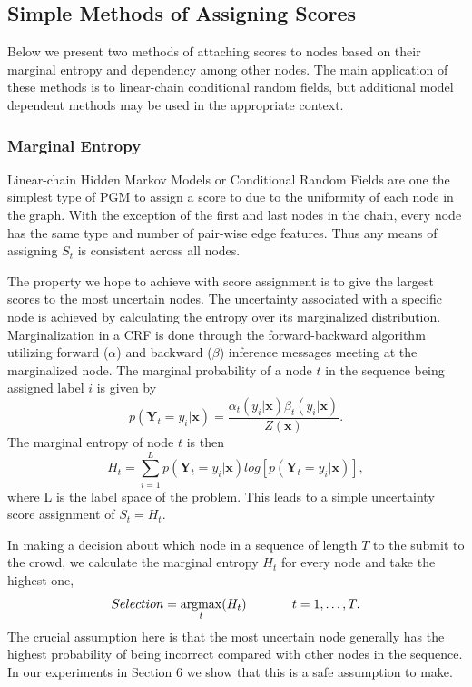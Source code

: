 \subsection{Simple Methods of Assigning Scores}
Below we present two methods of attaching scores to nodes based on their marginal entropy and dependency among other nodes.  The main application of these methods is to linear-chain conditional random fields, but additional model dependent methods may be used in the appropriate context.  

\subsubsection{Marginal Entropy}
Linear-chain Hidden Markov Models or Conditional Random Fields are one the simplest type of PGM to assign a score to due to the uniformity of each node in the graph.  With the exception of the first and last nodes in the chain, every node has the same type and number of pair-wise edge features.  Thus any means of assigning $S_{t}$ is consistent across all nodes.

The property we hope to achieve with score assignment is to give the largest scores to the most uncertain nodes.  The uncertainty associated with a specific node is achieved by calculating the entropy over its marginalized distribution.  Marginalization in a CRF is done through the forward-backward algorithm \cite{Lafferty01} utilizing forward ($\alpha$) and backward ($\beta$) inference messages meeting at the marginalized node.  The marginal probability of a node $t$ in the sequence being assigned label $i$ is given by
\begin{equation}
p(\mathbf{Y}_{t}=y_{i}|\mathbf{x}) = \frac{\alpha_{t}(y_{i}|\mathbf{x})\beta_{t}(y_{i}|\mathbf{x})}{Z(\mathbf{x})}.
\end{equation}
The marginal entropy of node $t$ is then
\begin{equation}
H_{t} = \sum_{i=1}^{L}p(\mathbf{Y}_{t} = y_{i}|\mathbf{x})log[p(\mathbf{Y}_{t} = y_{i}|\mathbf{x})],
\end{equation}
where L is the label space of the problem.  This leads to a simple uncertainty score assignment of $S_{t}=H_{t}$.

In making a decision about which node in a sequence of length $T$ to the submit to the crowd, we calculate the marginal entropy $H_{t}$ for every node and take the highest one,
\begin{equation}
Selection = \argmax_{t}(H_{t}) \hspace{0.5in} t=1,\dots,T.
\end{equation}
The crucial assumption here is that the most uncertain node generally has the highest probability of being incorrect compared with other nodes in the sequence.  In our experiments in Section 6 we show that this is a safe assumption to make.  

